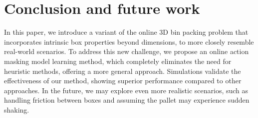 \section{Conclusion and future work}
\label{section:conclusion}

In this paper, we introduce a variant of the online 3D bin packing problem that incorporates intrinsic box properties beyond dimensions, to more closely resemble real-world scenarios. To address this new challenge, we propose an online action masking model learning method, which completely eliminates the need for heuristic methods, offering a more general approach. Simulations validate the effectiveness of our method, showing superior performance compared to other approaches. In the future, we may explore even more realistic scenarios, such as handling friction between boxes and assuming the pallet may experience sudden shaking. %